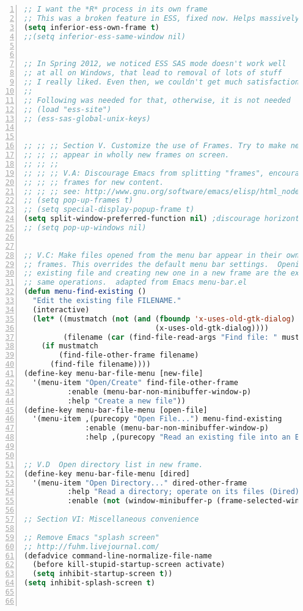 \documentclass[11pt,english]{beamer}
\begin{document}
\begin{frame}
\begin{lstlisting}[basicstyle={\tiny},language=Lisp,numbers=left,numberstyle={\tiny},tabsize=2]
;; I want the *R* process in its own frame
;; This was a broken feature in ESS, fixed now. Helps massively!
(setq inferior-ess-own-frame t)
;;(setq inferior-ess-same-window nil)


;; In Spring 2012, we noticed ESS SAS mode doesn't work well
;; at all on Windows, that lead to removal of lots of stuff
;; I really liked. Even then, we couldn't get much satisfaction.
;;
;; Following was needed for that, otherwise, it is not needed
;; (load "ess-site")
;; (ess-sas-global-unix-keys)


;; ;; ;; Section V. Customize the use of Frames. Try to make new content
;; ;; ;; appear in wholly new frames on screen.
;; ;; ;; 
;; ;; ;; V.A: Discourage Emacs from splitting "frames", encourage it to pop up new
;; ;; ;; frames for new content.
;; ;; ;; see: http://www.gnu.org/software/emacs/elisp/html_node/Choosing-Window.html
;; (setq pop-up-frames t)
;; (setq special-display-popup-frame t)
(setq split-window-preferred-function nil) ;discourage horizontal splits
;; (setq pop-up-windows nil)


;; V.C: Make files opened from the menu bar appear in their own
;; frames. This overrides the default menu bar settings.  Opening an
;; existing file and creating new one in a new frame are the exact
;; same operations.  adapted from Emacs menu-bar.el
(defun menu-find-existing ()
  "Edit the existing file FILENAME."
  (interactive)
  (let* ((mustmatch (not (and (fboundp 'x-uses-old-gtk-dialog)
                              (x-uses-old-gtk-dialog))))
         (filename (car (find-file-read-args "Find file: " mustmatch))))
    (if mustmatch
        (find-file-other-frame filename)
      (find-file filename))))
(define-key menu-bar-file-menu [new-file]
  '(menu-item "Open/Create" find-file-other-frame
	      :enable (menu-bar-non-minibuffer-window-p)
	      :help "Create a new file"))
(define-key menu-bar-file-menu [open-file]
  '(menu-item ,(purecopy "Open File...") menu-find-existing
              :enable (menu-bar-non-minibuffer-window-p)
              :help ,(purecopy "Read an existing file into an Emacs buffer")))


;; V.D  Open directory list in new frame.
(define-key menu-bar-file-menu [dired]
  '(menu-item "Open Directory..." dired-other-frame
	      :help "Read a directory; operate on its files (Dired)"
	      :enable (not (window-minibuffer-p (frame-selected-window menu-updating-frame)))))

;; Section VI: Miscellaneous convenience

;; Remove Emacs "splash screen"
;; http://fuhm.livejournal.com/
(defadvice command-line-normalize-file-name
  (before kill-stupid-startup-screen activate)
  (setq inhibit-startup-screen t))
(setq inhibit-splash-screen t)



\end{lstlisting}
\end{frame}
\end{document}
